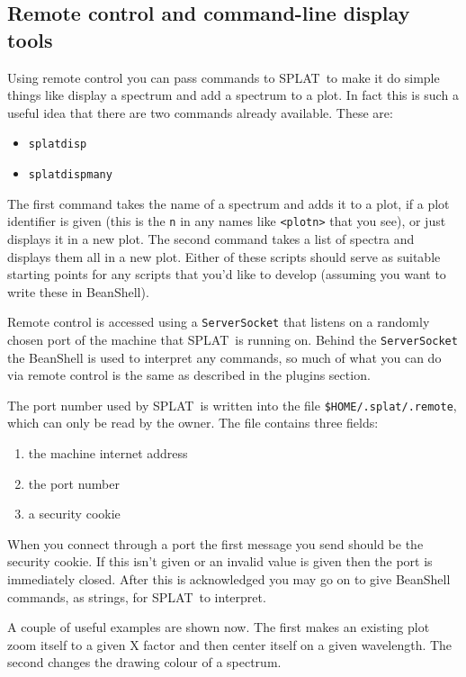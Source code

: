 \documentclass[twoside,11pt,nolof]{starlink}
\providecommand{\SPLAT}{\textsf{SPLAT}}
\providecommand{\hitext}[1]{\texttt{#1}}
\begin{document}
\subsection{Remote control and command-line display tools}

Using remote control you can pass commands to \SPLAT\ to make it do
simple things like display a spectrum and add a spectrum to a plot. In
fact this is such a useful idea that there are two commands already
available. These are:
\begin{itemize}
\item \hitext{splatdisp}
\item \hitext{splatdispmany}
\end{itemize}
The first command takes the name of a spectrum and adds it to a plot,
if a plot identifier is given (this is the \hitext{n} in any names
like \hitext{<plotn>} that you see), or just displays it in a new
plot. The second command takes a list of spectra and displays them all
in a new plot. Either of these scripts should serve as suitable
starting points for any scripts that you'd like to develop (assuming
you want to write these in BeanShell).

Remote control is accessed using a \hitext{ServerSocket} that listens
on a randomly chosen port of the machine that \SPLAT\ is running
on. Behind the \hitext{ServerSocket} the BeanShell is used to
interpret any commands, so much of what you can do via remote control
is the same as described in the plugins section.

The port number used by \SPLAT\ is written into the file
\hitext{\$HOME/.splat/.remote}, which can only be read by the
owner. The file contains three fields:
\begin{enumerate}
\item the machine internet address
\item the port number
\item a security cookie
\end{enumerate}
When you connect through a port the first message you send should be
the security cookie. If this isn't given or an invalid value is given
then the port is immediately closed. After this is acknowledged you
may go on to give BeanShell commands, as strings, for \SPLAT\ to
interpret.

A couple of useful examples are shown now. The first makes an existing
plot zoom itself to a given X factor and then center itself on a
given wavelength. The second changes the drawing colour of a spectrum.
\end{document}
